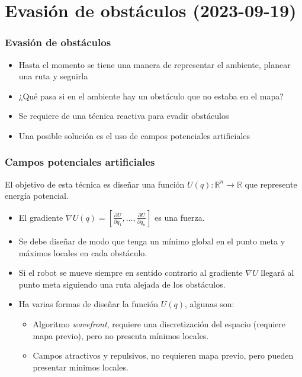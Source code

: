 \section{Evasión de obstáculos (2023-09-19)}
\begin{frame}\frametitle{Evasión de obstáculos}
  \begin{itemize}
  \item Hasta el momento se tiene una manera de representar el ambiente, planear una ruta y seguirla
  \item ¿Qué pasa si en el ambiente hay un obstáculo que no estaba en el mapa?
  \item Se requiere de una técnica reactiva para evadir obstáculos
  \item Una posible solución es el uso de campos potenciales artificiales
  \end{itemize}
\end{frame}

\begin{frame}\frametitle{Campos potenciales artificiales}
  El objetivo de esta técnica es diseñar una función $U(q):\mathbb{R}^n\rightarrow \mathbb{R}$ que represente energía potencial.
  \begin{itemize}
  \item El gradiente $\nabla U(q) = \left[\frac{\partial U}{\partial q_1},\dots,\frac{\partial U}{\partial q_n}\right]$ es una fuerza.
  \item Se debe diseñar de modo que tenga un mínimo global en el punto meta y máximos locales en cada obstáculo.
  \item Si el robot se mueve siempre en sentido contrario al gradiente $\nabla U$ llegará al punto meta siguiendo una ruta alejada de los obstáculos.
  \item Ha varias formas de diseñar la función $U(q)$, algunas son:
    \begin{itemize}
    \item Algoritmo \textit{wavefront}, requiere una discretización del espacio (requiere mapa previo), pero no presenta mínimos locales.
    \item Campos atractivos y repulsivos, no requieren mapa previo, pero pueden presentar mínimos locales. 
    \end{itemize}
  \end{itemize}
\end{frame}

